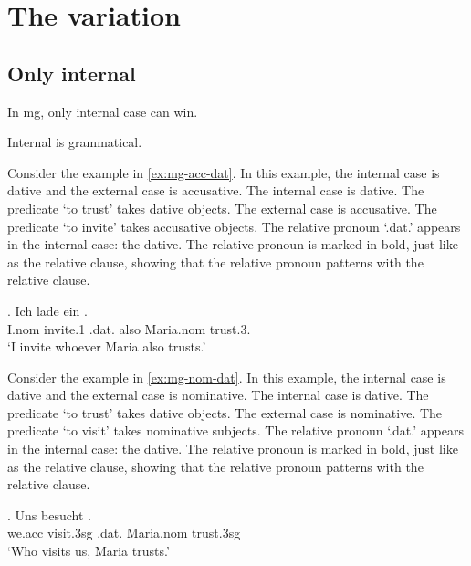 
\chapter{The variation}


\section{Only internal}

In \ac{mg}, only internal case can win.

Internal is grammatical.

Consider the example in \ref{ex:mg-acc-dat}. In this example, the internal case is dative and the external case is accusative.
The internal case is dative. The predicate  `to trust' takes dative objects.
The external case is accusative. The predicate  `to invite' takes accusative objects.
The relative pronoun  `.\ac{dat}.' appears in the internal case: the dative. The relative pronoun is marked in bold, just like as the relative clause, showing that the relative pronoun patterns with the relative clause.

\exg. Ich {lade ein}    . \\
I.\ac{nom} invite.1\scsub{[acc]} .\ac{dat}. also Maria.\ac{nom} trust.3\scsub{[dat]}.\\
`I invite whoever Maria also trusts.' \label{ex:mg-acc-dat}

Consider the example in \ref{ex:mg-nom-dat}. In this example, the internal case is dative and the external case is nominative.
The internal case is dative. The predicate  `to trust' takes dative objects.
The external case is nominative. The predicate  `to visit' takes nominative subjects.
The relative pronoun  `.\ac{dat}.' appears in the internal case: the dative. The relative pronoun is marked in bold, just like as the relative clause, showing that the relative pronoun patterns with the relative clause.

\exg. Uns besucht   .\\
we.\ac{acc} visit.3\ac{sg}\scsub{[nom]} .\ac{dat}. Maria.\ac{nom} trust.3\ac{sg}\scsub{[dat]}\\
`Who visits us, Maria trusts.' \label{ex:mg-nom-dat}

